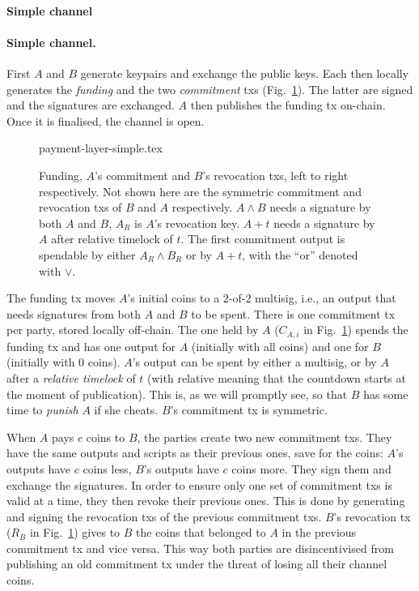   \makeatletter%
    {\paragraph{Simple channel}}%
    {\paragraph{Simple channel.}}%
  \makeatother%
  First $A$ and $B$ generate keypairs and exchange the public keys. Each then
  locally generates the \emph{funding} and the two \emph{commitment} txs
  (Fig.~\ref{figure:payment-layer-simple}). The latter are signed and the
  signatures are exchanged. $A$ then publishes the funding tx on-chain. Once it
  is finalised, the channel is open.

  \begin{figure}
    \centering
    {payment-layer-simple.tex}
    \caption{Funding, $A$'s commitment and $B$'s revocation txs, left
    to right respectively. Not shown here are the symmetric commitment and
    revocation txs of $B$ and $A$ respectively. $A \wedge B$ needs a signature
    by both $A$ and $B$, $A_R$ is $A$'s revocation key. $A+t$ needs a signature
    by $A$ after relative timelock of $t$. The first commitment output is
    spendable by either $A_R \wedge B_R$ or by $A + t$, with the ``or'' denoted
    with $\vee$.}
    \label{figure:payment-layer-simple}
  \end{figure}

  The funding tx moves $A$'s initial coins to a $2$-of-$2$ multisig, i.e., an
  output that needs signatures from both $A$ and $B$ to be spent. There is one
  commitment tx per party, stored locally off-chain. The one held by $A$
  ($C_{A,i}$ in Fig.~\ref{figure:payment-layer-simple}) spends the funding tx
  and has one output for $A$ (initially with all coins) and one for $B$
  (initially with $0$ coins). $A$'s output can be spent by either a multisig, or
  by $A$ after a \emph{relative timelock} of $t$ (with relative meaning that the countdown starts at the moment of
  publication). This is, as we will promptly see, so
  that $B$ has some time to \emph{punish} $A$ if she cheats. $B$'s commitment tx
  is symmetric.

  When $A$ pays $c$ coins to $B$, the parties create two new commitment txs.
  They have the same outputs and scripts as their previous ones, save for the
  coins: $A$'s outputs have $c$ coins less, $B$'s outputs have $c$ coins more.
  They sign them and exchange the signatures. In order to ensure only one set of
  commitment txs is valid at a time, they then revoke their previous ones. This
  is done by generating and signing the revocation txs of the previous
  commitment txs. $B$'s revocation tx ($R_B$ in
  Fig.~\ref{figure:payment-layer-simple}) gives to $B$ the coins that belonged
  to $A$ in the previous commitment tx and vice versa. This way both parties are
  disincentivised from publishing an old commitment tx under the threat of
  losing all their channel coins.

